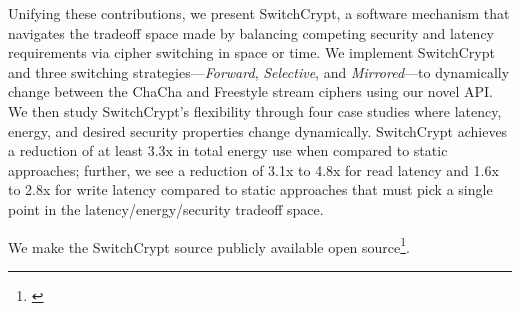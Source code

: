 Unifying these contributions, we present SwitchCrypt, a software mechanism that
navigates the tradeoff space made by balancing competing security and latency
requirements via cipher switching in space or time. We implement SwitchCrypt and
three switching strategies---\emph{Forward}, \emph{Selective}, and
\emph{Mirrored}---to dynamically change between the ChaCha and Freestyle stream
ciphers using our novel API. We then study SwitchCrypt's flexibility through
four case studies where latency, energy, and desired security properties change
dynamically. SwitchCrypt achieves a reduction of at least 3.3x in total energy
use when compared to static approaches; further, we see a reduction of 3.1x to
4.8x for read latency and 1.6x to 2.8x for write latency compared to static
approaches that must pick a single point in the latency/energy/security tradeoff
space.

We make the SwitchCrypt source publicly available open
source\footnote{\label{note1}\SystemURI}.
